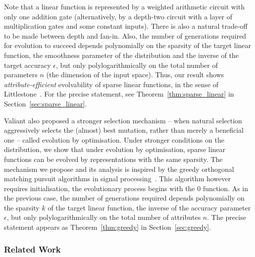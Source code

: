 Note that a linear function is represented by a weighted arithmetic circuit with
only one addition gate (alternatively, by a depth-two circuit with a layer of
multiplication gates and some constant inputs). There is also a natural
trade-off to be made between depth and fan-in. Also, the number of generations
required for evolution to succeed depends polynomially on the sparsity of the
target linear function, the smoothness parameter of the distribution and the
inverse of the target accuracy $\epsilon$, but only polylogarithmically on the
total number of parameters $n$ (the dimension of the input space). Thus, our
result shows \emph{attribute-efficient} evolvability of sparse linear functions,
in the sense of Littlestone~\cite{Littlestone:1988}.  For the precise statement,
see Theorem~\ref{thm:sparse_linear} in Section~\ref{sec:sparse_linear}.

Valiant also proposed a stronger selection mechanism -- when natural selection
aggressively selects the (almost) best mutation, rather than merely a beneficial
one -- called evolution by optimisation.  Under stronger conditions on the
distribution, we show that under evolution by optimisation, sparse linear
functions can be evolved by representations with the same sparsity. The
mechanism we propose and its analysis is inspired by the greedy orthogonal
matching pursuit algorithms in signal
processing~\cite{Donoho:2006-recovery,Tropp:2004-greed}. This algorithm however
requires initialisation, \ie the evolutionary process begins with the $0$
function. As in the previous case, the number of generations required depends
polynomially on the sparsity $k$ of the target linear function, the inverse of
the accuracy parameter $\epsilon$, but only polylogarithmically on the total
number of attributes $n$. The precise statement appears as
Theorem~\ref{thm:greedy} in Section~\ref{sec:greedy}.

\subsubsection*{Related Work}

